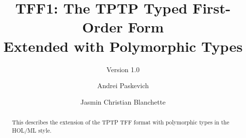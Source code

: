 \documentclass[draft,a4paper]{llncs}
\begin{document}
\title{
TFF1: The TPTP Typed First-Order Form \\ Extended with Polymorphic Types}
\subtitle{Version 1.0}

\author{
Andrei Paskevich \and Jasmin Christian Blanchette
}


\maketitle

\begin{abstract}
This \paper{} describes the extension of the TPTP TFF format with polymorphic
types in the HOL/ML style.
\end{abstract}












\end{document}
